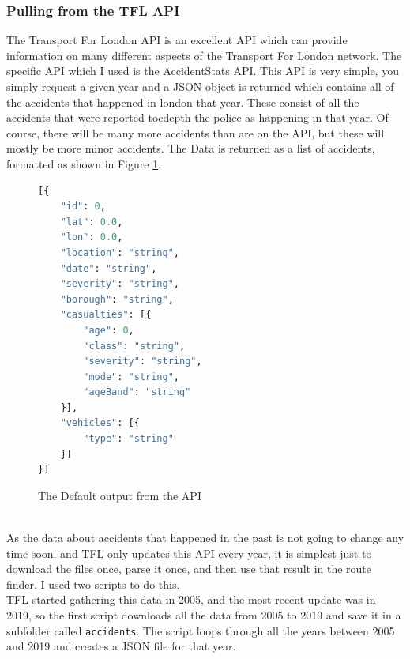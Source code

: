 \documentclass[11pt,twoside,a4paper]{article}
\begin{document}
\subsubsection{Pulling from the TFL API}
The Transport For London API is an excellent API which can provide information on many different aspects of the Transport For London network. The specific API which I used is the AccidentStats API.
This API is very simple, you simply request a given year and a JSON object is returned which contains all of the accidents that happened in london that year. These consist of all the accidents that were reported tocdepth
the police as happening in that year. Of course, there will be many more accidents than are on the API, but these will mostly be more minor accidents.
The Data is returned as a list of accidents, formatted as shown in Figure \ref{Default}.
\begin{figure}[t]
\begin{lstlisting}[language=Python]
[{
    "id": 0,
    "lat": 0.0,
    "lon": 0.0,
    "location": "string",
    "date": "string",
    "severity": "string",
    "borough": "string",
    "casualties": [{
        "age": 0,
        "class": "string",
        "severity": "string",
        "mode": "string",
        "ageBand": "string"
    }],
    "vehicles": [{
        "type": "string"
    }]
}]
    \end{lstlisting}
\caption{The Default output from the API \cite{tflapi}}
\label{Default}
\end{figure}
\\
As the data about accidents that happened in the past is not going to change any time soon, and TFL only updates this API every year, it is simplest just to download the files once, parse it once, and then 
use that result in the route finder. I used two scripts to do this.\\
TFL started gathering this data in 2005, and the most recent update was in 2019, so the first script downloads all the data from 2005 to 2019 and save it in a subfolder called \texttt{accidents}.
The script loops through all the years between 2005 and 2019 and creates a JSON file for that year. \\
\end{document}
